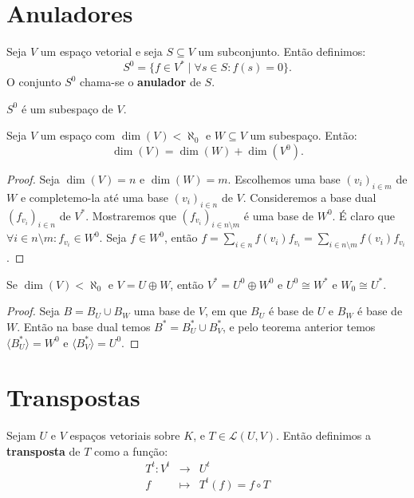 \documentclass[11pt,twoside,a4paper]{book}
\begin{document}
\section{Anuladores}

\begin{definicao}
Seja $V$ um espaço vetorial e seja $S\subseteq V$ um subconjunto. Então definimos:
\[
S^0=\{f\in V^*\mid\forall s\in S:f(s)=0\}.
\]
O conjunto $S^0$ chama-se o \textbf{anulador} de $S$.
\end{definicao}

\begin{proposicao}
$S^0$ é um subespaço de $V$.
\end{proposicao}

\begin{teorema}
Seja $V$ um espaço com $\dim(V)<\aleph_0$ e $W\subseteq V$ um subespaço. Então:
\[
\dim(V)=\dim(W)+\dim(V^0).
\]
\end{teorema}
\begin{proof}
Seja $\dim(V)=n$ e $\dim(W)=m$. Escolhemos uma base $(v_i)_{i\in m}$ de $W$ e completemo-la até uma base $(v_i)_{i\in n}$ de $V$. Consideremos a base dual $(f_{v_i})_{i\in n}$ de $V^*$. Mostraremos que $(f_{v_i})_{i\in n\setminus m}$ é uma base de $W^0$. É claro que $\forall i\in n\setminus m:f_{v_i}\in W^0$. Seja $f\in W^0$, então $f=\sum_{i\in n}f(v_i)f_{v_i}=\sum_{i\in n\setminus m}f(v_i)f_{v_i}$.
\end{proof}

\begin{teorema}
Se $\dim(V)<\aleph_0$ e $V=U\oplus W$, então $V^*=U^0\oplus W^0$ e $U^0\cong W^*$ e $W_0\cong U^*$.
\end{teorema}
\begin{proof}
Seja $B=B_U\cup B_W$ uma base de $V$, em que $B_U$ é base de $U$ e $B_W$ é base de $W$. Então na base dual temos $B^*=B_U^*\cup B_V^*$, e pelo teorema anterior temos $\langle B_U^*\rangle=W^0$ e $\langle B_V^*\rangle=U^0$.
\end{proof}

\section{Transpostas}

\begin{definicao}
Sejam $U$ e $V$ espaços vetoriais sobre $K$, e $T\in\mathcal{L}(U,V)$. Então definimos a \textbf{transposta} de $T$ como a função:
\[
\begin{array}{rcl}
T^t:V^t&\rightarrow&U^t\\f&\mapsto&T^t(f)=f\circ T
\end{array}
\]
\end{definicao}
\end{document}
